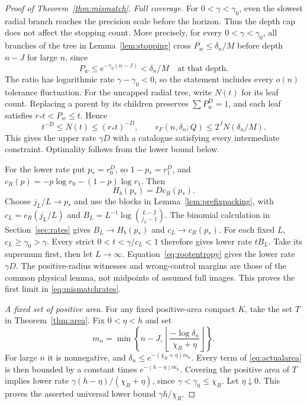 \documentclass[11pt]{amsart}
\theoremstyle{definition}
\theoremstyle{remark}
\numberwithin{equation}{section}
\begin{document}
\begin{proof}[Proof of Theorem~\ref{thm:mismatch}]
\emph{Full coverage.}
For $0<\gamma<\gamma_0$, even the slowest radial branch reaches
the precision scale before the horizon. Thus the depth cap does
not affect the stopping count. More precisely, for every
$0<\gamma<\gamma_0$,
all branches of the tree in Lemma~\ref{lem:stopping} cross
$P_w\le\delta_n/M$ before depth $n-J$ for large $n$, since
\[
P_w\le e^{-\gamma_0(n-J)}<\delta_n/M
       \quad\text{at that depth}.
\]
The ratio has logarithmic rate $\gamma-\gamma_0<0$, so the
statement includes every $o(n)$ tolerance fluctuation.
For the uncapped radial tree, write $N(t)$ for its leaf count.
Replacing a parent by its children preserves $\sum P_w^D=1$,
and each leaf satisfies $r_*t<P_w\le t$. Hence
\begin{equation}\label{eq:mismatchtree}
t^{-D}\le N(t)\le(r_*t)^{-D},\qquad
r_F(n,\delta_n;Q)\le2^JN(\delta_n/M).
\end{equation}
This gives the upper rate $\gamma D$ with a catalogue satisfying
every intermediate constraint. Optimality follows from the lower
bound below.

For the lower rate put $p_*=r_0^D$, so $1-p_*=r_1^D$, and
$c_R(p)=-p\log r_0-(1-p)\log r_1$. Then
\begin{equation}\label{eq:rootentropy}
H_b(p_*)=D c_R(p_*).
\end{equation}
Choose $j_L/L\to p_*$ and use the blocks in
Lemma~\ref{lem:prefixpacking}, with
$c_L=c_R(j_L/L)$ and $B_L=L^{-1}\log\binom{L-2}{j_L-1}$.
The binomial calculation in Section~\ref{sec:rates} gives
$B_L\to H_b(p_*)$ and $c_L\to c_R(p_*)$.
For each fixed $L$, $c_L\ge\gamma_0>\gamma$.
Every strict $0<t<\gamma/c_L<1$ therefore gives lower rate $tB_L$.
Take its supremum first, then let $L\to\infty$.
Equation~\eqref{eq:rootentropy} gives the lower rate $\gamma D$.
The positive-radius witnesses and wrong-control margins are those
of the common physical lemma, not midpoints of assumed full images.
This proves the first limit in \eqref{eq:mismatchrates}.

\smallskip
\emph{A fixed set of positive area.}
For any fixed positive-area compact $K$, take the set $T$ in
Theorem~\ref{thm:area}. Fix $0<\eta<h$ and set
\[
m_n=\min\left\{n-J,
       \left\lfloor\frac{-\log\delta_n}{\chi_R+\eta}\right\rfloor\right\}.
\]
For large $n$ it is nonnegative, and
$\delta_n\le e^{-(\chi_R+\eta)m_n}$.
Every term of \eqref{eq:actualarea} is then bounded by a constant
times $e^{-(h-\eta)m_n}$. Covering the positive area of $T$ implies
lower rate $\gamma(h-\eta)/(\chi_R+\eta)$, since
$\gamma<\gamma_0\le\chi_R$. Let $\eta\downarrow0$.
This proves the asserted universal lower bound $\gamma h/\chi_R$.


\end{proof}
\end{document}
